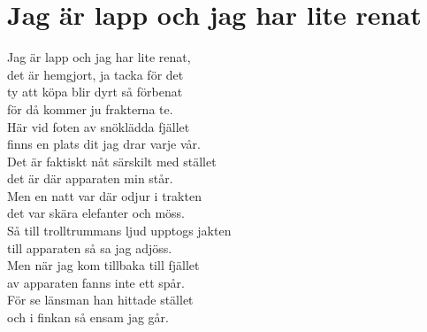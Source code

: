 \section{Jag är lapp och jag har lite renat}
Jag är lapp och jag har lite renat,\\
det är hemgjort, ja tacka för det\\
ty att köpa blir dyrt så förbenat\\
för då kommer ju frakterna te.\\

Här vid foten av snöklädda fjället\\
finns en plats dit jag drar varje vår.\\
Det är faktiskt nåt särskilt med stället\\
det är där apparaten min står.\\

Men en natt var där odjur i trakten\\
det var skära elefanter och möss.\\
Så till trolltrummans ljud upptogs jakten\\
till apparaten så sa jag adjöss.\\

Men när jag kom tillbaka till fjället\\
av apparaten fanns inte ett spår.\\
För se länsman han hittade stället\\
och i finkan så ensam jag går.\\